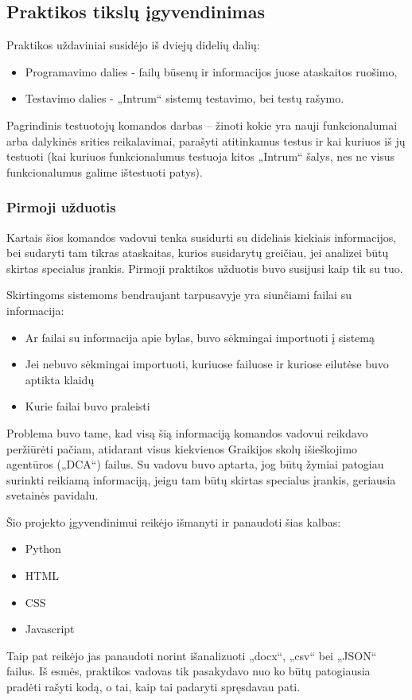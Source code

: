 \documentclass{VUMIFPSkursinis}
\begin{document}
\subsection{Praktikos tikslų įgyvendinimas}

Praktikos uždaviniai susidėjo iš dviejų didelių dalių:
\begin{itemize}
    \item Programavimo dalies - failų būsenų ir informacijos juose ataskaitos ruošimo,
    \item Testavimo dalies - „Intrum“  sistemų testavimo, bei testų rašymo.
\end{itemize}

Pagrindinis testuotojų komandos darbas -- žinoti kokie yra nauji funkcionalumai arba dalykinės srities reikalavimai, parašyti atitinkamus testus ir kai kuriuos iš jų testuoti (kai kuriuos funkcionalumus testuoja kitos „Intrum“ šalys, nes ne visus funkcionalumus galime ištestuoti patys).

\subsubsection{Pirmoji užduotis}
Kartais šios komandos vadovui tenka susidurti su dideliais kiekiais informacijos, bei sudaryti tam tikras ataskaitas, kurios susidarytų greičiau, jei analizei būtų skirtas specialus įrankis. Pirmoji praktikos užduotis buvo susijusi kaip tik su tuo. 

Skirtingoms sistemoms bendraujant tarpusavyje yra siunčiami failai su informacija: 
\begin{itemize}
    \item Ar failai su informacija apie bylas, buvo sėkmingai importuoti į sistemą
    \item Jei nebuvo sėkmingai importuoti, kuriuose failuose ir kuriose eilutėse buvo aptikta klaidų
    \item Kurie failai buvo praleisti
\end{itemize}

Problema buvo tame, kad visą šią informaciją komandos vadovui reikdavo peržiūrėti pačiam, atidarant visus kiekvienos Graikijos skolų išieškojimo agentūros („DCA“) failus. Su vadovu buvo aptarta, jog būtų žymiai patogiau surinkti reikiamą informaciją, jeigu tam būtų skirtas specialus įrankis, geriausia svetainės pavidalu.

Šio projekto įgyvendinimui reikėjo išmanyti ir panaudoti šias kalbas:
\begin{itemize}
    \item Python
    \item HTML
    \item CSS
    \item Javascript
\end{itemize} 
Taip pat reikėjo jas panaudoti norint išanalizuoti „docx“, „csv“ bei „JSON“ failus. Iš esmės, praktikos vadovas tik pasakydavo nuo ko būtų patogiausia pradėti rašyti kodą, o tai, kaip tai padaryti spręsdavau pati.
\end{document}
